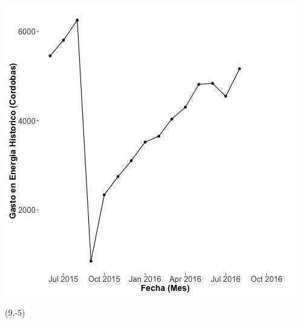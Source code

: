 \documentclass{article}\usepackage[]{graphicx}\usepackage[]{color}
\newenvironment{knitrout}{}{} %
\begin{document}
\begin{knitrout}
\color{fgcolor}
\includegraphics[scale=0.65]{figure/A29_historico_cordobas} 
\end{knitrout}

 \begin{textblock}{1}(9,-5)
\begin{minipage}{20em}
\begingroup

\endgroup
\end{minipage}
\end{textblock}



%
\end{document}
